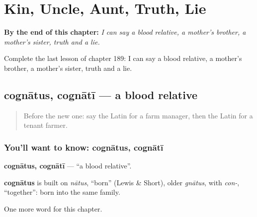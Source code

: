 
\chapter{Kin, Uncle, Aunt, Truth, Lie}
\label{ch:la-blood-relative-mother-s-brother-mother-s-sister-truth-lie}

\begin{chapteropening}
\textbf{By the end of this chapter:} \emph{I can say a blood relative, a mother's brother, a mother's sister, truth and a lie.}

Complete the last lesson of chapter 189: I can say a blood relative, a mother's brother, a mother's sister, truth and a lie.
\end{chapteropening}

\section[cognātus, cognātī]{cognātus, cognātī — a blood relative}

\label{lesson:LA-C189-cognatus}



\begin{quote}
Before the new one: say the Latin for a farm manager, then the Latin for a tenant farmer.
\end{quote}

\subsection*{You'll want to know: cognātus, cognātī}
\textbf{cognātus, cognātī} — \textquotedblleft{}a blood relative\textquotedblright{}.

\begin{cousinweb}
\textbf{cognātus} is built on \emph{nātus}, \textquotedblleft{}born\textquotedblright{} (Lewis \& Short), older \emph{gnātus}, with \emph{con-}, \textquotedblleft{}together\textquotedblright{}: born into the same family.
\end{cousinweb}

\begin{grammarlens}[title={What you've built}]
One more word for this chapter.
\end{grammarlens}

